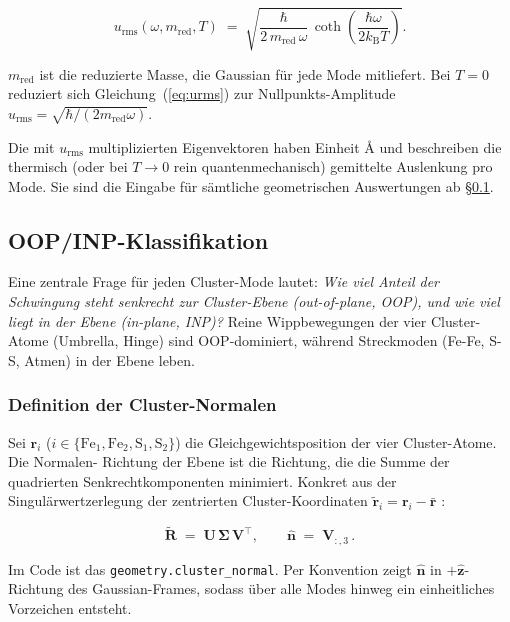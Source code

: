 \documentclass[11pt,a4paper,twoside]{article}
\newcommand{\rvec}{\mathbf{r}}
\newcommand{\nhat}{\hat{\mathbf{n}}}
\newcommand{\zhat}{\hat{\mathbf{z}}}
\newcommand{\kB}{k_{\mathrm{B}}}
\newcommand{\urms}{u_{\mathrm{rms}}}
\newcommand{\Fei}{\mathrm{Fe}}
\newcommand{\OOP}{\mathrm{OOP}}
\theoremstyle{remark}
\begin{document}
\begin{equation}
  \urms(\omega, m_{\mathrm{red}}, T) \;=\;
  \sqrt{\frac{\hbar}{2\,m_{\mathrm{red}}\,\omega} \,
        \coth\!\left(\frac{\hbar\omega}{2\kB T}\right)} .
  \label{eq:urms}
\end{equation}

$m_{\mathrm{red}}$ ist die reduzierte Masse, die Gaussian f\"ur jede
Mode mitliefert. Bei $T=0$ reduziert sich Gleichung~(\ref{eq:urms}) zur
Nullpunkts-Amplitude
$\urms = \sqrt{\hbar / (2 m_{\mathrm{red}} \omega)}$.

Die mit $\urms$ multiplizierten Eigenvektoren haben Einheit \AA{} und
beschreiben die thermisch (oder bei $T \to 0$ rein quantenmechanisch)
gemittelte Auslenkung pro Mode. Sie sind die Eingabe f\"ur s\"amtliche
geometrischen Auswertungen ab \S\ref{sec:oop-inp}.

\subsection{OOP/INP-Klassifikation}
\label{sec:oop-inp}

Eine zentrale Frage f\"ur jeden Cluster-Mode lautet: \emph{Wie viel
Anteil der Schwingung steht senkrecht zur Cluster-Ebene
(out-of-plane, OOP), und wie viel liegt in der Ebene (in-plane, INP)?}
Reine Wippbewegungen der vier Cluster-Atome (Umbrella, Hinge) sind
$\OOP$-dominiert, w\"ahrend Streckmoden (Fe-Fe, S-S, Atmen) in der
Ebene leben.

\subsubsection*{Definition der Cluster-Normalen}

Sei $\rvec_i$ ($i \in \{\Fei_1, \Fei_2, \mathrm{S}_1, \mathrm{S}_2\}$)
die Gleichgewichtsposition der vier Cluster-Atome. Die Normalen-
Richtung der Ebene ist die Richtung, die die Summe der quadrierten
Senkrechtkomponenten minimiert. Konkret aus der Singul\"arwertzerlegung
der zentrierten Cluster-Koordinaten
$\tilde{\rvec}_i = \rvec_i - \bar{\rvec}$ \cite{Kabsch1976}:

\begin{equation}
  \tilde{\mathbf{R}} \;=\; \mathbf{U}\,\boldsymbol{\Sigma}\,\mathbf{V}^\top ,
  \qquad
  \nhat \;=\; \mathbf{V}_{:,3}\,.
  \label{eq:cluster-normal-svd}
\end{equation}

Im Code ist das \texttt{geometry.cluster\_normal}.
Per Konvention zeigt $\nhat$ in $+\zhat$-Richtung des Gaussian-Frames,
sodass \"uber alle Modes hinweg ein einheitliches Vorzeichen entsteht.
\end{document}
